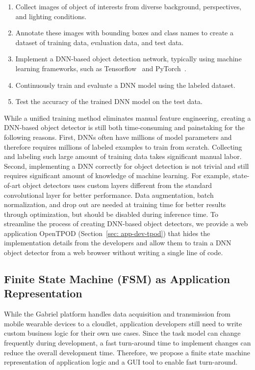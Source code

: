 \begin{enumerate}
  \item Collect images of object of interests from diverse background,
        perspectives, and lighting conditions.
  \item Annotate these images with bounding boxes and class names to create a
        dataset of training data, evaluation data, and test data.
  \item Implement a DNN-based object detection network, typically using machine learning frameworks,
        such as Tensorflow~\cite{abadi2016tensorflow} and
        PyTorch~\cite{paszke2019pytorch}.
  \item Continuously train and evaluate a DNN model using the labeled dataset.
  \item Test the accuracy of the trained DNN model on the test data.
\end{enumerate}

While a unified training method eliminates manual feature engineering, creating
a DNN-based object detector is still both time-consuming and painstaking for the
following reasons. First, DNNs often have millions of model parameters and
therefore requires millions of labeled examples to train from scratch.
Collecting and labeling such large amount of training data takes significant
manual labor. Second, implementing a DNN correctly for object detection is not
trivial and still requires significant amount of knowledge of machine learning.
For example, state-of-art object detectors uses custom layers different from the
standard convolutional layer for better performance. Data augmentation, batch
normalization, and drop out are needed at training time for better results
through optimization, but should be disabled during inference time. To
streamline the process of creating DNN-based object detectors, we provide a web
application OpenTPOD (Section~\ref{sec: app-dev-tpod}) that hides the implementation
details from the developers and allow them to train a DNN object detector from a
web browser without writing a single line of code.

\subsection{Finite State Machine (FSM) as Application Representation}
\label{sec: app-dev-fsm-representation}

While the Gabriel platform handles data acquisition and transmission from mobile
wearable devices to a cloudlet, application developers still need to write
custom business logic for their own use cases. Since the task model can change
frequently during development, a fast turn-around time to implement changes can
reduce the overall development time. Therefore, we propose a finite state
machine representation of application logic and a GUI tool to enable fast
turn-around.

